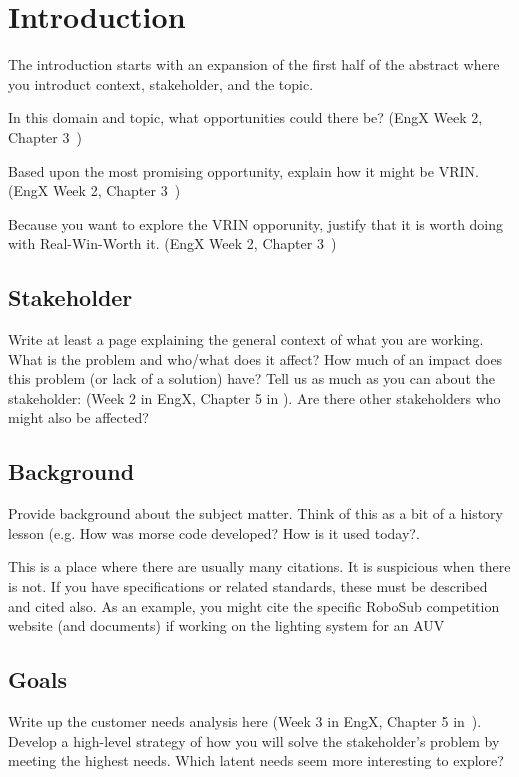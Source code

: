 \chapter{Introduction\label{cha:introduction}}

The introduction starts with an expansion of the first half of the abstract where you introduct context, stakeholder, and the topic.

In this domain and topic, what opportunities could there be?  (EngX Week 2, Chapter 3~\cite{ulrich2020product-design-development})

Based upon the most promising opportunity, explain how it might be VRIN. (EngX Week 2, Chapter 3~\cite{ulrich2020product-design-development})

Because you want to explore the VRIN opporunity, justify that it is worth doing with Real-Win-Worth it. (EngX Week 2, Chapter 3~\cite{ulrich2020product-design-development})

\section{Stakeholder}
Write at least a page explaining the general context of what you are working.
What is the problem and who/what does it affect?
How much of an impact does this problem (or lack of a solution) have?
Tell us as much as you can about the stakeholder: (Week 2 in EngX, Chapter 5 in \cite{ulrich2020product-design-development}).
Are there other stakeholders who might also be affected?

\section{Background}
Provide background about the subject matter.
Think of this as a bit of a history lesson (e.g. How was morse code
developed?  How is it used today?.

This is a place where there are usually many citations.
It is suspicious when there is not.
If you have specifications or related standards, these must be
described and cited also.
As an example, you might cite the specific
RoboSub competition website (and documents) if working on the lighting system for an AUV\cite{guls2016auvlight}

\section{Goals}
Write up the customer needs analysis here (Week 3 in EngX, Chapter 5 in~\cite{ulrich2020product-design-development}).
Develop a high-level strategy of how you will solve the stakeholder's problem by meeting the highest needs.
Which latent needs seem more interesting to explore?

